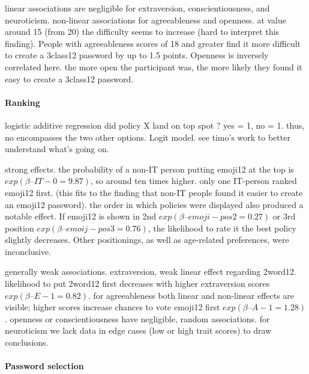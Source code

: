linear associations are negligible for extraversion, conscientiousness, and neuroticism. 
non-linear associations for agreeableness and openness. at value around 15 (from 20) the difficulty seems to increase (hard to interpret this finding). People with agreeableness scores of 18 and greater find it more difficult to create a 3class12 password by up to 1.5 points. Openness is inversely correlated here. the more open the participant was, the more likely they found it easy to create a 3class12 password. 


\paragraph{Ranking}
logistic additive regression %
did policy X land on top spot ? yes = 1, no = 1. thus, no encompasses the two other options.
Logit model. see timo's work to better understand what's going on. 



strong effects. the probability of a non-IT person putting emoji12 at the top is $exp(\beta–{IT-0}=9.87)$, so around ten times higher. only one IT-person ranked emoji12 first. (this fits to the finding that non-IT people found it easier to create an emoji12 password).
the order in which policies were displayed also produced a notable effect. If emoji12 is shown in 2nd $exp(\beta–{emoji-pos2}=0.27)$ or 3rd position $exp(\beta–{emoij-pos3}=0.76)$, the likelihood to rate it the best policy slightly decreases. Other positionings, as well as age-related preferences, were inconclusive.

generally weak associations.
extraversion, weak linear effect regarding 2word12. likelihood to put 2word12 first decreases with higher extraversion scores $exp(\beta–{E-1}=0.82)$. for agreeableness both linear and non-linear effects are visible; higher scores increase chances to vote emoji12 first $exp(\beta–{A-1}=1.28)$. openness or conscientiousness have negligible, random associations. for neuroticism we lack data in edge cases (low or high trait scores) to draw conclusions. %


\paragraph{Password selection}

